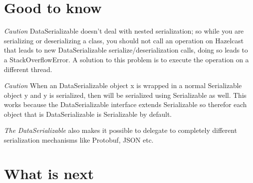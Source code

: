\section{Good to know}

\emph{Caution} DataSerializable doesn't deal with nested serialization; so while you are serializing or deserializing a class, you should not call an operation on Hazelcast that leads to new DataSerializable serialize/deserialization calls,  doing so leads to a StackOverflowError. A solution to this problem is to execute the operation on a different thread. 

\emph{Caution} When an DataSerializable object x is wrapped in a normal Serializable object y and y is serialized, then will be serialized using Serializable as well. This works because the DataSerializable interface extends Serializable so therefor each object that is DataSerializable is Serializable by default.

\emph{The DataSerializable} also makes it possible to delegate to completely different serialization mechanisms like Protobuf, JSON etc.

\section{What is next}